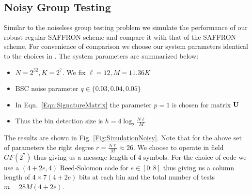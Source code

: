\documentclass[conference,twocolumn]{IEEEtran}
\newcommand*{\MyPath}{../../bib}
\begin{document}
\subsection*{Noisy Group Testing}
Similar to the noiseless group testing problem we simulate the performance of our robust regular SAFFRON scheme and compare it with that of the SAFFRON scheme. For convenience of comparison we choose our system parameters identical to the choices in \cite{lee2015saffron}. The system parameters are summarized below:
\begin{itemize}
\item $N=2^{32}, K=2^7$. We fix $\ell=12, M=11.36K$
\item BSC noise parameter $q\in\{0.03,0.04,0.05\}$
\item In Eqn.~\ref{Eqn:SignatureMatrix} the parameter $p=1$ is chosen for matrix $\mathbf{U}$
\item Thus the bin detection size is $h=4\log_2 \frac{N\ell}{M}$
\end{itemize}
The results are shown in Fig. \ref{Fig:SimulationNoisy}. Note that for the above set of parameters the right degree $r=\frac{N\ell}{M}\approx 26$. We choose to operate in field $GF(2^7)$ thus giving us a message length of $4$ symbols. For the choice of code we use a $(4+2e,4)$ Reed-Solomon code for $e\in[0:8]$ thus giving us a column length of $4\times 7(4+2e)$ bits at each bin and the total number of tests $m=28M(4+2e)$.



\end{document}
